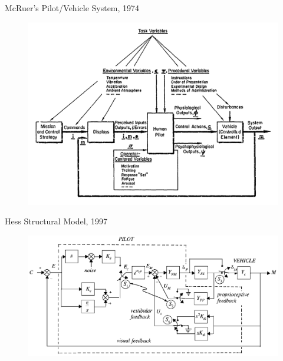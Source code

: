 \documentclass[10pt]{beamer}
\begin{document}
\begin{frame}[fragile]{McRuer's Pilot/Vehicle System, 1974~\cite{McRuer1974}}
  \begin{figure}[h!]
    \begin{center}
      \includegraphics[width=\linewidth]{../img/Screen_Shot_2018-07-25_at_10.37.08_AM.png}
    \end{center}
  \end{figure}
\end{frame}

\begin{frame}[fragile]{Hess Structural Model, 1997~\cite{Hess1997}}
  \begin{figure}[h!]
    \begin{center}
      \includegraphics[width=\linewidth]{../img/Screen_Shot_2018-07-31_at_11.21.44_AM.png}
    \end{center}
  \end{figure}
\end{frame}
\end{document}
